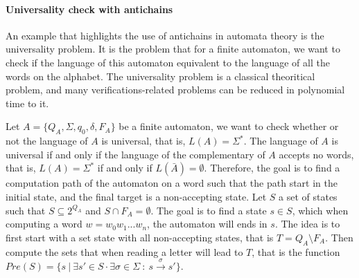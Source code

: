 \documentclass[letterpaper]{article}
\theoremstyle{definition}
\begin{document}
\paragraph{Universality check with antichains}

An example that highlights the use of antichains in automata theory is
the universality problem.
It is the problem that for a finite automaton, we want to
check if the language of this automaton equivalent to the language
of all the words on the alphabet. The universality problem is a classical
theoritical problem, and many verifications-related problems can be
reduced in polynomial time to it.

Let $A = \{Q_A, \Sigma, q_0, \delta, F_A\}$ be a finite automaton,
we want to check whether or not
the language of $A$ is universal, that is, $L(A) = \Sigma^*$.
The language of $A$ is universal if and only if the language
of the complementary of $A$ accepts no words, that is,
$L(A) = \Sigma^*$ if and only if $L(\bar{A}) = \emptyset$.
Therefore, the goal is to find a computation path of the
automaton on a word such that the path start in the initial state,
and the final target is a non-accepting state.
Let $S$ a set of states such that $S \subseteq 2^{Q_A}$ and
$S \cap F_A = \emptyset$. The goal is to find a state $s \in S$,
which when computing a word $w = w_0w_1...w_n$, the automaton will ends
in $s$. The idea is to first start with a set state with all non-accepting
states, that is $T = Q_A \setminus F_A$. Then compute the sets that
when reading a letter will lead to $T$, that is the function
$Pre(S) = \{s \ | \ \exists s' \in S \cdot \exists \sigma \in \Sigma \ :
 \ s \xrightarrow{\sigma} s'\}$.

\end{document}
